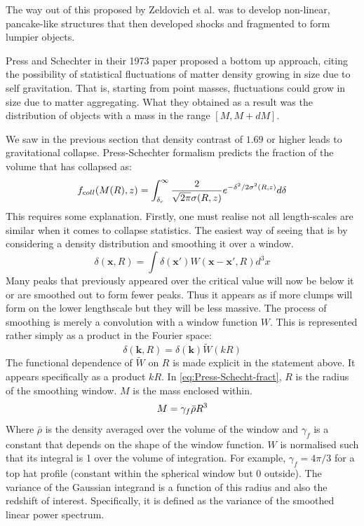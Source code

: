 \documentclass[12pt,a4paper,twoside]{book}
\begin{document}
		The way out of this proposed by Zeldovich et al. was to develop non-linear, pancake-like structures that then developed shocks and fragmented to form lumpier objects.
		
		Press and Schechter in their 1973 paper proposed a bottom up approach, citing the possibility of statistical fluctuations of matter density growing in size due to self gravitation. That is, starting from point masses, fluctuations could grow in size due to matter aggregating. What they obtained as a result was the distribution of objects with a mass in the range $[M, M+dM]$.
		
		We saw in the previous section that density contrast of $1.69$ or higher leads to gravitational collapse. Press-Schechter formalism predicts the fraction of the volume that has collapsed as:
		\begin{equation}
			f_{coll}(M(R),z)=\int_{\delta_c}^{\infty}\frac{2}{\sqrt{2\pi}\sigma(R,z)}e^{-\delta^2/2\sigma^2(R,z)}d\delta\\
			\label{eq:Press-Schecht-fract}
		\end{equation}
		This requires some explanation. Firstly, one must realise not all length-scales are similar when it comes to collapse statistics. The easiest way of seeing that is by considering a density distribution and smoothing it over a window. 
		$$
			\delta(\mathbf{x},R)=\int \delta(\mathbf{x'})W(\mathbf{x-x'},R)d^3x
		$$
		Many peaks that previously appeared over the critical value will now be below it or are smoothed out to form fewer peaks. Thus it appears as if more clumps will form on the lower lengthscale but they will be less massive.
		The process of smoothing is merely a convolution with a window function $W$. This is represented rather simply as a product in the Fourier space:
		$$
			\delta(\mathbf{k},R)=\delta(\mathbf{k})\tilde{W}(kR)
		$$
		The functional dependence of $\tilde{W}$ on $R$ is made explicit in the statement above. It appears specifically as a product $kR$.
		In \ref{eq:Press-Schecht-fract}, $R$ is the radius of the smoothing window. $M$ is the mass enclosed within. 
		$$
			M=\gamma_f\bar{\rho}R^3\\
		$$
		Where $\bar{\rho}$ is the density averaged over the volume of the window and $\gamma_f$ is a constant that depends on the shape of the window function. $W$ is normalised such that its integral is 1 over the volume of integration. For example, $\gamma_f=4\pi/3$ for a top hat profile (constant within the spherical window but 0 outside).
		The  variance of the Gaussian integrand is a function of this radius and also the redshift of interest. Specifically, it is defined as the variance of the smoothed linear power spectrum. 
\end{document}
